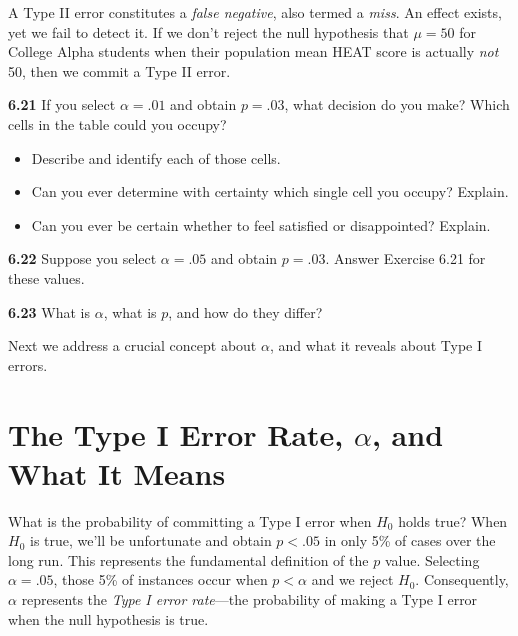 \documentclass[
  letterpaper,
  DIV=11,
  numbers=noendperiod]{scrreprt}
\providecommand{\tightlist}{%
  \setlength{\itemsep}{0pt}\setlength{\parskip}{0pt}}
\begin{document}
A Type II error constitutes a \emph{false negative}, also termed a
\emph{miss}. An effect exists, yet we fail to detect it. If we don't
reject the null hypothesis that \(\mu = 50\) for College Alpha students
when their population mean HEAT score is actually \emph{not} 50, then we
commit a Type II error.

\textbf{6.21} If you select \(\alpha = .01\) and obtain \(p = .03\),
what decision do you make? Which cells in the table could you occupy?

\begin{itemize}
\tightlist
\item
  Describe and identify each of those cells.
\item
  Can you ever determine with certainty which single cell you occupy?
  Explain.
\item
  Can you ever be certain whether to feel satisfied or disappointed?
  Explain.
\end{itemize}

\textbf{6.22} Suppose you select \(\alpha = .05\) and obtain
\(p = .03\). Answer Exercise 6.21 for these values.

\textbf{6.23} What is \(\alpha\), what is \(p\), and how do they differ?

Next we address a crucial concept about \(\alpha\), and what it reveals
about Type I errors.

\section{\texorpdfstring{The Type I Error Rate, \(\alpha\), and What It
Means}{The Type I Error Rate, \textbackslash alpha, and What It Means}}\label{the-type-i-error-rate-alpha-and-what-it-means}

What is the probability of committing a Type I error when \(H_0\) holds
true? When \(H_0\) is true, we'll be unfortunate and obtain \(p < .05\)
in only 5\% of cases over the long run. This represents the fundamental
definition of the \(p\) value. Selecting \(\alpha = .05\), those 5\% of
instances occur when \(p < \alpha\) and we reject \(H_0\). Consequently,
\(\alpha\) represents the \emph{Type I error rate}---the probability of
making a Type I error when the null hypothesis is true.
\end{document}
